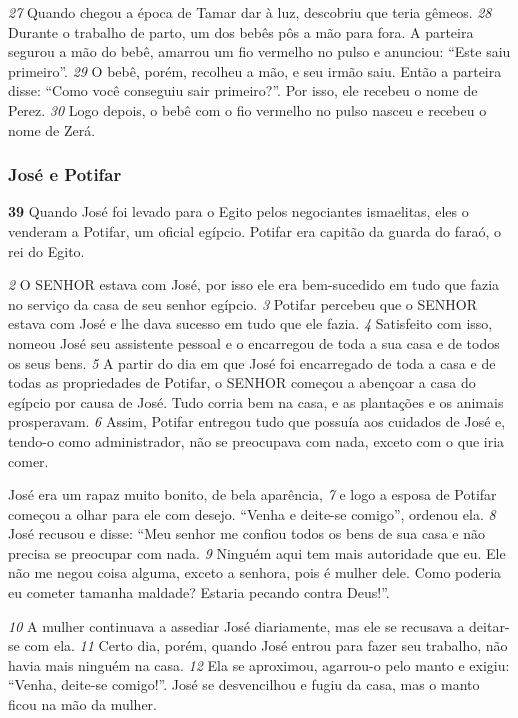 \bigskip   
\textit{\tiny 27}
Quando chegou a época de Tamar dar à luz, descobriu que teria gêmeos.
\textit{\tiny 28}
Durante o trabalho de parto, um dos bebês pôs a mão para fora. A parteira
segurou a mão do bebê, amarrou um fio vermelho no pulso e anunciou: “Este saiu
primeiro”. 
\textit{\tiny 29}
O bebê, porém, recolheu a mão, e seu irmão saiu. Então a parteira
disse: “Como você conseguiu sair primeiro?”. Por isso, ele recebeu o nome de
Perez.
\textit{\tiny 30}
Logo depois, o bebê com o fio vermelho no pulso nasceu e recebeu o
nome de Zerá.

\bigskip
\subsubsection*{José e Potifar}
\textbf{\large 39}
   Quando José foi levado para o Egito pelos negociantes ismaelitas, eles o
venderam a Potifar, um oficial egípcio. Potifar era capitão da guarda do faraó, o
rei do Egito. 

\bigskip
\textit{\tiny 2} 
O SENHOR estava com José, por isso ele era bem-sucedido em tudo que fazia no
serviço da casa de seu senhor egípcio. 
\textit{\tiny 3} 
Potifar percebeu que o SENHOR estava com
José e lhe dava sucesso em tudo que ele fazia. 
\textit{\tiny 4} 
Satisfeito com isso, nomeou José
seu assistente pessoal e o encarregou de toda a sua casa e de todos os seus bens. 
\textit{\tiny 5} 
A partir do dia em que José foi encarregado de toda a casa e de todas as
propriedades de Potifar, o SENHOR começou a abençoar a casa do egípcio por
causa de José. Tudo corria bem na casa, e as plantações e os animais prosperavam. 
\textit{\tiny 6} 
Assim, Potifar entregou tudo que possuía aos cuidados de José e, tendo-o como
administrador, não se preocupava com nada, exceto com o que iria comer.

\bigskip
   José era um rapaz muito bonito, de bela aparência, 
\textit{\tiny 7}
e logo a esposa de Potifar
começou a olhar para ele com desejo. “Venha e deite-se comigo”, ordenou ela. 
\textit{\tiny 8} 
José recusou e disse: “Meu senhor me confiou todos os bens de sua casa e não
precisa se preocupar com nada. 
\textit{\tiny 9} 
Ninguém aqui tem mais autoridade que eu. Ele
não me negou coisa alguma, exceto a senhora, pois é mulher dele. Como poderia
eu cometer tamanha maldade? Estaria pecando contra Deus!”.
   
\bigskip
\textit{\tiny 10}
A mulher continuava a assediar José diariamente, mas ele se recusava a
deitar-se com ela. 
\textit{\tiny 11}
Certo dia, porém, quando José entrou para fazer seu trabalho,
não havia mais ninguém na casa. 
\textit{\tiny 12}
Ela se aproximou, agarrou-o pelo manto e
exigiu: “Venha, deite-se comigo!”. José se desvencilhou e fugiu da casa, mas o
manto ficou na mão da mulher.
   
